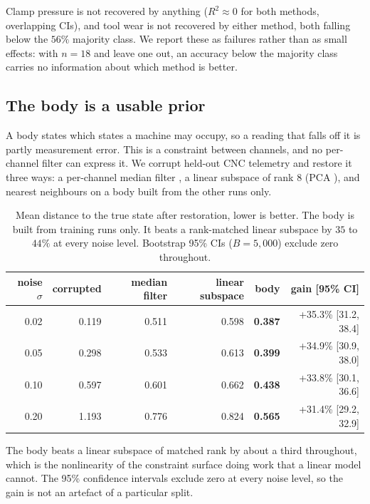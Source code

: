 \documentclass[11pt]{article}
\begin{document}
Clamp pressure is not recovered by anything ($R^2 \approx 0$ for both methods,
overlapping CIs), and tool wear is not recovered by either method, both
falling below the $56\%$ majority class. We report these as failures rather
than as small effects: with $n=18$ and leave one out, an accuracy below the
majority class carries no information about which method is better.

\subsection{The body is a usable prior}
\label{sec:prior}

A body states which states a machine may occupy, so a reading that falls off it
is partly measurement error. This is a constraint between channels, and no
per-channel filter can express it. We corrupt held-out CNC telemetry and
restore it three ways: a per-channel median filter \cite{tukey1977}, a linear
subspace of rank 8 (PCA \cite{pearson1901}), and nearest neighbours on a body
built from the other runs only.

\begin{table}[t]
\centering
\begin{tabular}{rrrrrr}
\toprule
noise $\sigma$ & corrupted & median filter & linear subspace & body & gain [95\% CI] \\
\midrule
0.02 & 0.119 & 0.511 & 0.598 & \textbf{0.387} & +35.3\% [31.2, 38.4] \\
0.05 & 0.298 & 0.533 & 0.613 & \textbf{0.399} & +34.9\% [30.9, 38.0] \\
0.10 & 0.597 & 0.601 & 0.662 & \textbf{0.438} & +33.8\% [30.1, 36.6] \\
0.20 & 1.193 & 0.776 & 0.824 & \textbf{0.565} & +31.4\% [29.2, 32.9] \\
\bottomrule
\end{tabular}
\caption{Mean distance to the true state after restoration, lower is better.
The body is built from training runs only. It beats a rank-matched linear
subspace by $35$ to $44\%$ at every noise level. Bootstrap 95\% CIs
($B=5{,}000$) exclude zero throughout.}
\label{tab:prior}
\end{table}

The body beats a linear subspace of matched rank by about a third throughout,
which is the nonlinearity of the constraint surface doing work that a linear
model cannot. The 95\% confidence intervals exclude zero at every noise level,
so the gain is not an artefact of a particular split.
\end{document}
